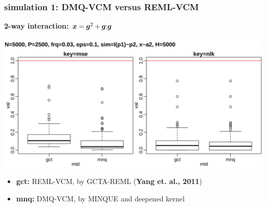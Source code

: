 \documentclass{beamer}
\begin{document}
\begin{frame}\frametitle{simulation 1: DMQ-VCM versus REML-VCM}
  \textbf{2-way interaction: ${\bm{x}} = {\bm{g}}^2 + {\bm{g}}\mathbf{:}{\bm{g}}$} \\
  \centerline{\includegraphics[width=.9\linewidth]{img/ukb_whl_p02}}
  \textbf{\color{blue}{inner plot: strategies, from left to right:}}
  \begin{itemize}
  \item \textbf{gct:} REML-VCM, by GCTA-REML (\textbf{Yang et. al., 2011})
  \item \textbf{mnq:} DMQ-VCM, by MINQUE and deepened kernel
  \end{itemize}
\end{frame}
\end{document}
